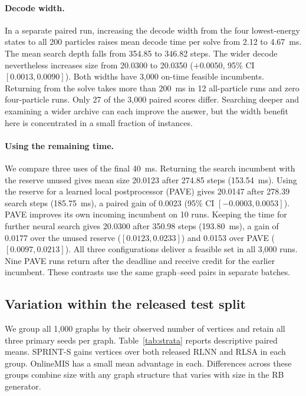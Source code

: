 \paragraph{Decode width.}
In a separate paired run, increasing the decode width from the four lowest-energy states to all 200 particles raises mean decode time per solve from 2.12 to 4.67~ms. The mean search depth falls from 354.85 to 346.82 steps. The wider decode nevertheless increases size from 20.0300 to 20.0350 (\(+0.0050\), 95\% CI \([0.0013,0.0090]\)). Both widths have 3,000 on-time feasible incumbents. Returning from the solve takes more than 200~ms in 12 all-particle runs and zero four-particle runs. Only 27 of the 3,000 paired scores differ. Searching deeper and examining a wider archive can each improve the answer, but the width benefit here is concentrated in a small fraction of instances.

\paragraph{Using the remaining time.}
We compare three uses of the final 40~ms. Returning the search incumbent with the reserve unused gives mean size 20.0123 after 274.85 steps (153.54~ms). Using the reserve for a learned local postprocessor (PAVE) gives 20.0147 after 278.39 search steps (185.75~ms), a paired gain of 0.0023 (95\% CI \([-0.0003,0.0053]\)). PAVE improves its own incoming incumbent on 10 runs. Keeping the time for further neural search gives 20.0300 after 350.98 steps (193.80~ms), a gain of 0.0177 over the unused reserve (\([0.0123,0.0233]\)) and 0.0153 over PAVE (\([0.0097,0.0213]\)). All three configurations deliver a feasible set in all 3,000 runs. Nine PAVE runs return after the deadline and receive credit for the earlier incumbent. These contrasts use the same graph--seed pairs in separate batches.

\subsection{Variation within the released test split}
\label{app:strata}
We group all 1,000 graphs by their observed number of vertices and retain all three primary seeds per graph. Table~\ref{tab:strata} reports descriptive paired means. SPRINT-S gains vertices over both released RLNN and RLSA in each group. OnlineMIS has a small mean advantage in each. Differences across these groups combine size with any graph structure that varies with size in the RB generator.

